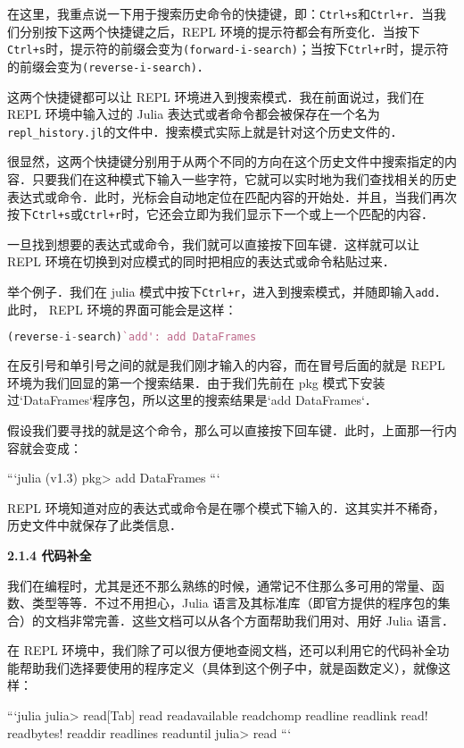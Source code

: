 在这里，我重点说一下用于搜索历史命令的快捷键，即：\verb|Ctrl+s|和\verb|Ctrl+r|．当我们分别按下这两个快捷键之后，REPL 环境的提示符都会有所变化．当按下\verb|Ctrl+s|时，提示符的前缀会变为\verb|(forward-i-search)|；当按下\verb|Ctrl+r|时，提示符的前缀会变为\verb|(reverse-i-search)|．

这两个快捷键都可以让 REPL 环境进入到搜索模式．我在前面说过，我们在 REPL 环境中输入过的 Julia 表达式或者命令都会被保存在一个名为\verb|repl_history.jl|的文件中．搜索模式实际上就是针对这个历史文件的．

很显然，这两个快捷键分别用于从两个不同的方向在这个历史文件中搜索指定的内容．只要我们在这种模式下输入一些字符，它就可以实时地为我们查找相关的历史表达式或命令．此时，光标会自动地定位在匹配内容的开始处．并且，当我们再次按下\verb|Ctrl+s|或\verb|Ctrl+r|时，它还会立即为我们显示下一个或上一个匹配的内容．

一旦找到想要的表达式或命令，我们就可以直接按下回车键．这样就可以让 REPL 环境在切换到对应模式的同时把相应的表达式或命令粘贴过来．

举个例子．我们在 julia 模式中按下\verb|Ctrl+r|，进入到搜索模式，并随即输入\verb|add|．此时， REPL 环境的界面可能会是这样：

\begin{lstlisting}[language=julia]
(reverse-i-search)`add': add DataFrames
\end{lstlisting}

在反引号和单引号之间的就是我们刚才输入的内容，而在冒号后面的就是 REPL 环境为我们回显的第一个搜索结果．由于我们先前在 pkg 模式下安装过`DataFrames`程序包，所以这里的搜索结果是`add DataFrames`．

假设我们要寻找的就是这个命令，那么可以直接按下回车键．此时，上面那一行内容就会变成：

```julia
(v1.3) pkg> add DataFrames
```

REPL 环境知道对应的表达式或命令是在哪个模式下输入的．这其实并不稀奇，历史文件中就保存了此类信息．

\textbf{2.1.4 代码补全}

我们在编程时，尤其是还不那么熟练的时候，通常记不住那么多可用的常量、函数、类型等等．不过不用担心，Julia 语言及其标准库（即官方提供的程序包的集合）的文档非常完善．这些文档可以从各个方面帮助我们用对、用好 Julia 语言．

在 REPL 环境中，我们除了可以很方便地查阅文档，还可以利用它的代码补全功能帮助我们选择要使用的程序定义（具体到这个例子中，就是函数定义），就像这样：

```julia
julia> read[Tab]
read          readavailable  readchomp      readline       readlink
read!         readbytes!     readdir        readlines      readuntil
julia> read
```

